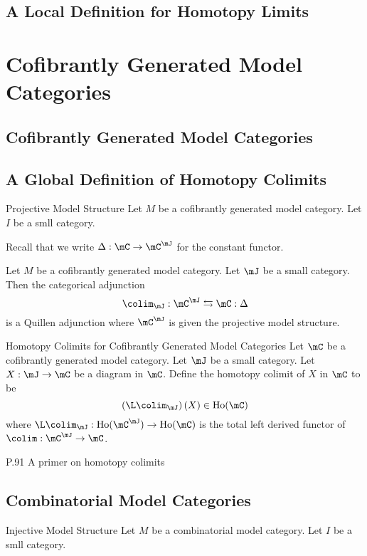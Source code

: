 \documentclass[a4paper]{article}
\begin{document}
\subsection{A Local Definition for Homotopy Limits}

\pagebreak
\section{Cofibrantly Generated Model Categories}
\subsection{Cofibrantly Generated Model Categories}

\subsection{A Global Definition of Homotopy Colimits}
\begin{defn}{Projective Model Structure}{} Let $M$ be a cofibrantly generated model category. Let $I$ be a smll category. 
\end{defn}

Recall that we write $\Delta:\mC\to\mC^\mJ$ for the constant functor. 

\begin{prp}{}{} Let $M$ be a cofibrantly generated model category. Let $\mJ$ be a small category. Then the categorical adjunction $$\colim_\mJ:\mC^\mJ\leftrightarrows\mC:\Delta$$ is a Quillen adjunction where $\mC^\mJ$ is given the projective model structure. 
\end{prp}

\begin{defn}{Homotopy Colimits for Cofibrantly Generated Model Categories}{} Let $\mC$ be a cofibrantly generated model category. Let $\mJ$ be a small category. Let $X:\mJ\to\mC$ be a diagram in $\mC$. Define the homotopy colimit of $X$ in $\mC$ to be $$\left(\L\colim_\mJ\right)(X)\in\text{Ho}(\mC)$$ where $\L\colim_\mJ:\text{Ho}(\mC^\mJ)\to\text{Ho}(\mC)$ is the total left derived functor of $\colim:\mC^\mJ\to\mC$. 
\end{defn}

P.91 A primer on homotopy colimits

\subsection{Combinatorial Model Categories}
\begin{defn}{Injective Model Structure}{} Let $M$ be a combinatorial model category. Let $I$ be a smll category. 
\end{defn}
\end{document}
